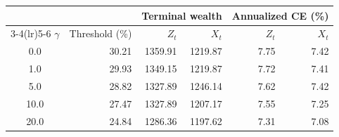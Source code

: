 \begin{tabular}{c r r r r r}
\toprule
 & & \multicolumn{2}{c}{Terminal wealth} & \multicolumn{2}{c}{Annualized CE (\%)} \\
\cmidrule(lr){3-4}\cmidrule(lr){5-6}
$\gamma$ & Threshold (\%) & $Z_t$ & $X_t$ & $Z_t$ & $X_t$ \\
\midrule
0.0 & 30.21 & 1359.91 & 1219.87 & 7.75 & 7.42 \\
1.0 & 29.93 & 1349.15 & 1219.87 & 7.72 & 7.41 \\
5.0 & 28.82 & 1327.89 & 1246.14 & 7.62 & 7.42 \\
10.0 & 27.47 & 1327.89 & 1207.17 & 7.55 & 7.25 \\
20.0 & 24.84 & 1286.36 & 1197.62 & 7.31 & 7.08 \\
\bottomrule
\end{tabular}
